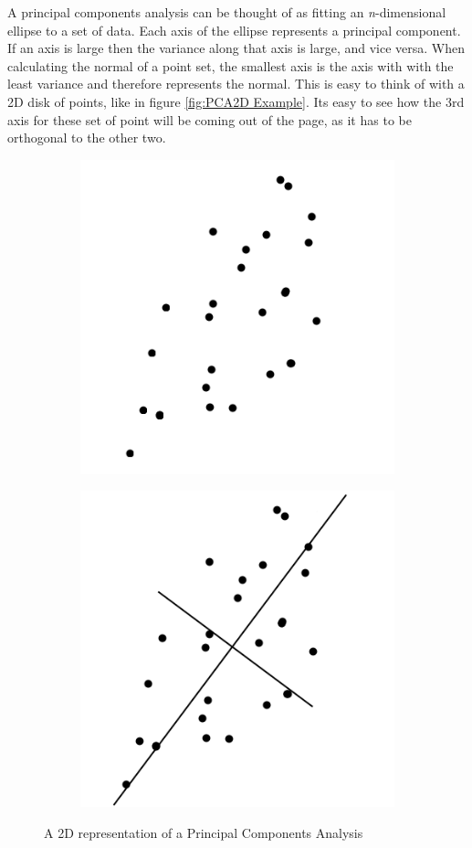 		A principal components analysis can be thought of as fitting an \textit{n}-dimensional ellipse to a set of data. Each axis of the ellipse represents a principal component. If an axis is large then the variance along that axis is large, and vice versa. When calculating the normal of a point set, the smallest axis is the axis with with the least variance and therefore represents the normal. This is easy to think of with a 2D disk of points, like in figure \ref{fig:PCA2D Example}. Its easy to see how the 3rd axis for these set of point will be coming out of the page, as it has to be orthogonal to the other two.
		
		\begin{figure}[H]
			\centering
			\begin{subfigure}{.5\textwidth}
				\centering
				\includegraphics[width=0.6\linewidth]{Includes/images/pca1}

				\label{fig:sub1}
			\end{subfigure}%
			\begin{subfigure}{.5\textwidth}
				\centering
				\includegraphics[width=0.6\linewidth]{Includes/images/pca2}

				\label{fig:sub2}
			\end{subfigure}
			\caption{A 2D representation of a Principal Components Analysis }
		\end{figure} 
		
